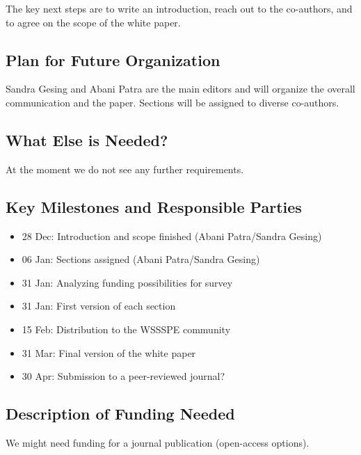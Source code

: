 The key next steps are to write an introduction, reach out to the co-authors,
and to agree on the scope of the white paper.

\subsection{Plan for Future Organization}

Sandra Gesing and Abani Patra are the main editors and will organize the overall
communication and the paper. Sections will be assigned to diverse co-authors.

\subsection{What Else is Needed?}

At the moment we do not see any further requirements.

\subsection{Key Milestones and Responsible Parties}
\begin{itemize}
\item 28 Dec: Introduction and scope finished (Abani Patra/Sandra Gesing)
\item 06 Jan: Sections assigned (Abani Patra/Sandra Gesing)
\item 31 Jan: Analyzing funding possibilities for survey
\item 31 Jan: First version of each section
\item 15 Feb: Distribution to the WSSSPE community
\item 31 Mar: Final version of the white paper
\item 30 Apr: Submission to a peer-reviewed journal?
\end{itemize}


\subsection{Description of Funding Needed}
We might need funding for a journal publication (open-access options).
